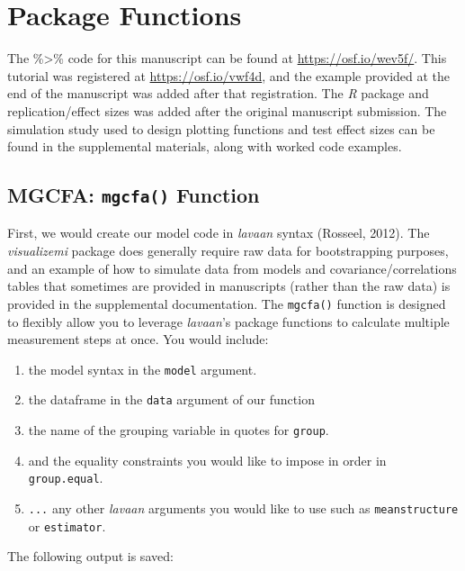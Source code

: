 \documentclass[
  man]{apa7}
\providecommand{\tightlist}{%
  \setlength{\itemsep}{0pt}\setlength{\parskip}{0pt}}
\begin{document}
\section{Package Functions}\label{package-functions}

The \%\textgreater\% code for this manuscript can be found at \url{https://osf.io/wev5f/}. This tutorial was registered at \url{https://osf.io/vwf4d}, and the example provided at the end of the manuscript was added after that registration. The \emph{R} package and replication/effect sizes was added after the original manuscript submission. The simulation study used to design plotting functions and test effect sizes can be found in the supplemental materials, along with worked code examples.

\subsection{\texorpdfstring{MGCFA: \texttt{mgcfa()} Function}{MGCFA: mgcfa() Function}}\label{mgcfa-mgcfa-function}

First, we would create our model code in \emph{lavaan} syntax (Rosseel, 2012). The \emph{visualizemi} package does generally require raw data for bootstrapping purposes, and an example of how to simulate data from models and covariance/correlations tables that sometimes are provided in manuscripts (rather than the raw data) is provided in the supplemental documentation. The \texttt{mgcfa()} function is designed to flexibly allow you to leverage \emph{lavaan}'s package functions to calculate multiple measurement steps at once. You would include:

\begin{enumerate}
\def\labelenumi{\arabic{enumi})}
\tightlist
\item
  the model syntax in the \texttt{model} argument.
\item
  the dataframe in the \texttt{data} argument of our function
\item
  the name of the grouping variable in quotes for \texttt{group}.
\item
  and the equality constraints you would like to impose in order in \texttt{group.equal}.
\item
  \texttt{...} any other \emph{lavaan} arguments you would like to use such as \texttt{meanstructure} or \texttt{estimator}.
\end{enumerate}

The following output is saved:
\end{document}
